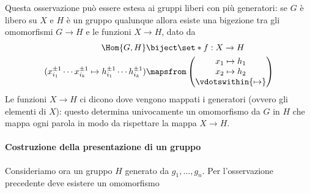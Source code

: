 Questa osservazione può essere estesa ai gruppi liberi con più generatori: se $G$ è libero su $X$ e $H$ è un gruppo qualunque allora esiste una bigezione tra gli omomorfismi $G \to H$ e le funzioni $X \to H$, dato da
\begin{align*}
    \Hom{G, H} &\biject \set*{f : X \to H}\\
    (x_{i_1}^{\pm 1}\cdots x_{i_k}^{\pm 1} \mapsto h_{i_1}^{\pm 1}\cdots h_{i_k}^{\pm 1}) &\mapsfrom \begin{pmatrix}
        x_1 \mapsto h_1 \\
        x_2 \mapsto h_2 \\
        \vdotswithin{\mapsto}
    \end{pmatrix}
\end{align*}
Le funzioni $X \to H$ ci dicono dove vengono mappati i generatori (ovvero gli elementi di $X$): questo determina univocamente un omomorfismo da $G$ in $H$ che mappa ogni parola in modo da rispettare la mappa $X \to H$.

\paragraph{Costruzione della presentazione di un gruppo} Consideriamo ora un gruppo $H$ generato da $g_1, \dots, g_n$. Per l'osservazione precedente deve esistere un omomorfismo 